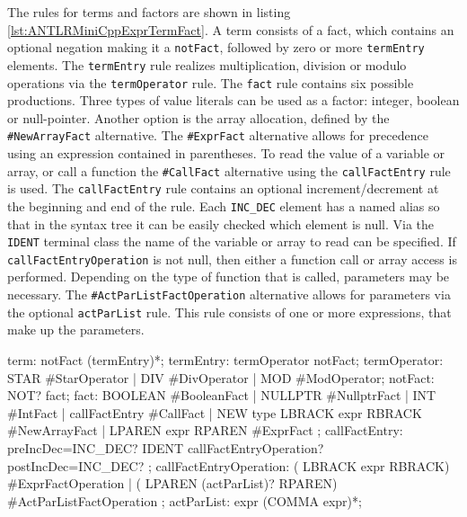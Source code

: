 The rules for terms and factors are shown in listing \ref{lst:ANTLRMiniCppExprTermFact}. A term consists of a fact, which contains an optional negation making it a \verb|notFact|, followed by zero or more \verb|termEntry| elements. The \verb|termEntry| rule realizes multiplication, division or modulo operations via the \verb|termOperator| rule. The \verb|fact| rule contains six possible productions. Three types of value literals can be used as a factor: integer, boolean or null-pointer. Another option is the array allocation, defined by the \verb|#NewArrayFact| alternative. The \verb|#ExprFact| alternative allows for precedence using an expression contained in parentheses. To read the value of a variable or array, or call a function the \verb|#CallFact| alternative using the \verb|callFactEntry| rule is used. The \verb|callFactEntry| rule contains an optional increment/decrement at the beginning and end of the rule. Each \verb|INC_DEC| element has a named alias so that in the syntax tree it can be easily checked which element is null. Via the \verb|IDENT| terminal class the name of the variable or array to read can be specified. If \verb|callFactEntryOperation| is not null, then either a function call or array access is performed. Depending on the type of function that is called, parameters may be necessary. The \verb|#ActParListFactOperation| alternative allows for parameters via the optional \verb|actParList| rule. This rule consists of one or more expressions, that make up the parameters.     

\begin{AntlrCode}[float,numbers=none,caption=Expression rules for terms and factors of the MiniC++ ANTLR grammar., label=lst:ANTLRMiniCppExprTermFact]
term:             notFact (termEntry)*;
termEntry:        termOperator notFact;
termOperator:     STAR                         #StarOperator
                | DIV                          #DivOperator
                | MOD                          #ModOperator;
notFact:          NOT? fact;
fact:             BOOLEAN                      #BooleanFact
                | NULLPTR                      #NullptrFact
                | INT                          #IntFact
                | callFactEntry                #CallFact
                | NEW type LBRACK expr RBRACK  #NewArrayFact
                | LPAREN expr RPAREN           #ExprFact
                ;
callFactEntry:    preIncDec=INC_DEC?
                  IDENT
                  callFactEntryOperation?
                  postIncDec=INC_DEC?
                  ;
callFactEntryOperation:
      ( LBRACK expr    RBRACK)                #ExprFactOperation
    | ( LPAREN (actParList)?    RPAREN)       #ActParListFactOperation
    ;
actParList:       expr (COMMA expr)*;
\end{AntlrCode}

